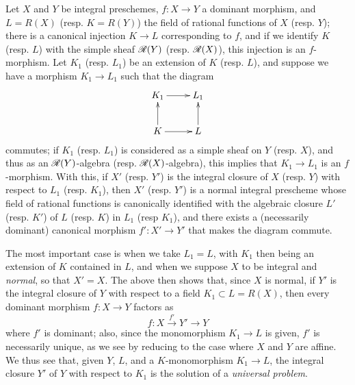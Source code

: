 \begin{env}[6.3.9]
\label{II.6.3.9}
Let $X$ and $Y$ be integral preschemes, $f:X\to Y$ a dominant morphism, and $L=R(X)$ (resp. $K=R(Y)$) the field of rational functions of $X$ (resp. $Y$);
there is a canonical injection $K\to L$ corresponding to $f$, and if we identify $K$ (resp. $L$) with the simple sheaf $\mathscr{R}(Y)$ (resp. $\mathscr{R}(X)$), this injection is an $f$-morphism.
Let $K_1$ (resp. $L_1$) be an extension of $K$ (resp. $L$), and suppose we have a morphism $K_1\to L_1$ such that the diagram
\[
  \xymatrix{
    K_1 \ar[r]
    & L_1
  \\K \ar[u] \ar[r]
    & L \ar[u]
  }
\]
commutes;
if $K_1$ (resp. $L_1$) is considered as a simple sheaf on $Y$ (resp. $X$), and thus as an $\mathscr{R}(Y)$-algebra (resp. $\mathscr{R}(X)$-algebra), this implies that $K_1\to L_1$ is an $f$-morphism.
With this, if $X'$ (resp. $Y'$) is the integral closure of $X$ (resp. $Y$) with respect to $L_1$ (resp. $K_1$), then $X'$ (resp. $Y'$) is a normal integral prescheme  whose field of rational functions is canonically identified with the algebraic closure $L'$ (resp. $K'$) of $L$ (resp. $K$) in $L_1$ (resp $K_1$), and there exists a (necessarily dominant) canonical morphism $f':X'\to Y'$ that makes the diagram  commute.

The most important case is when we take $L_1=L$, with $K_1$ then being an extension of $K$ contained in $L$, and when we suppose $X$ to be integral and \emph{normal}, so that $X'=X$.
The above then shows that, since $X$ is normal, if $Y'$ is the integral closure of $Y$ with respect to a field $K_1\subset L=R(X)$, then every dominant morphism $f:X\to Y$ factors as
\[
  f:X\xrightarrow{f'}Y'\to Y
\]
where $f'$ is dominant;
also, since the monomorphism $K_1\to L$ is given, $f'$ is necessarily unique, as we see by reducing to the case where $X$ and $Y$ are affine.
We thus see that, given $Y$, $L$, and a $K$-monomorphism $K_1\to L$, the integral closure $Y'$ of $Y$ with respect to $K_1$ is the solution of a \emph{universal problem}.
\end{env}

